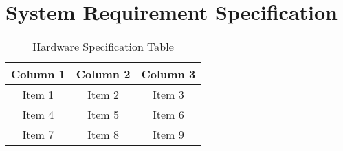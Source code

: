 \section{System Requirement Specification}
\begin{table}[h]
\caption{Hardware Specification Table}
\vspace{12pt}
\centering
\begin{tabular}{|c|c|c|}
\hline
Column 1 & Column 2 & Column 3 \\
\hline
Item 1   & Item 2   & Item 3   \\
Item 4   & Item 5   & Item 6   \\
Item 7   & Item 8   & Item 9   \\
\hline
\end{tabular}

\label{tab:Hardware Specification Table}
\end{table}



